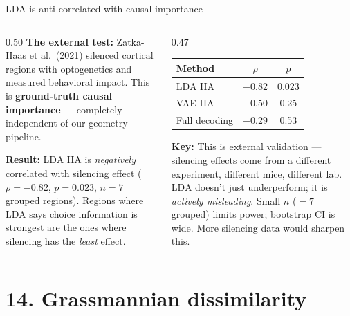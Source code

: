 \documentclass[aspectratio=169,11pt]{beamer}
\begin{document}
\begin{frame}{LDA is anti-correlated with causal importance}
\begin{columns}[T]
\begin{column}{0.50\textwidth}
\textbf{The external test:} Zatka-Haas et al.\ (2021) silenced cortical regions with optogenetics and measured behavioral impact. This is \textbf{ground-truth causal importance} --- completely independent of our geometry pipeline.

\vspace{0.5em}
\textbf{Result:} LDA IIA is \emph{negatively} correlated with silencing effect ($\rho = -0.82$, $p = 0.023$, $n = 7$ grouped regions). Regions where LDA says choice information is strongest are the ones where silencing has the \emph{least} effect.
\end{column}

\begin{column}{0.47\textwidth}
\vspace{0.5em}
{\small
\begin{tabular}{lcc}
\toprule
\textbf{Method} & \textbf{$\rho$} & \textbf{$p$} \\
\midrule
LDA IIA & $\mathbf{-0.82}$ & $\mathbf{0.023}$ \\
VAE IIA & $-0.50$ & 0.25 \\
Full decoding & $-0.29$ & 0.53 \\
\bottomrule
\end{tabular}
}

\vspace{0.5em}
{\small \textbf{Key:} This is external validation --- silencing effects come from a different experiment, different mice, different lab. LDA doesn't just underperform; it is \emph{actively misleading}. Small $n$ ($= 7$ grouped) limits power; bootstrap CI is wide. More silencing data would sharpen this.}
\end{column}
\end{columns}
\end{frame}

\section{14. Grassmannian dissimilarity}
\end{document}
